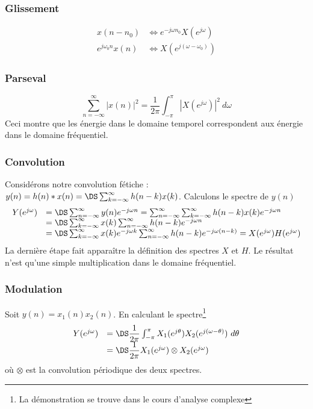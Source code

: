 		\subsubsection{Glissement}
		\begin{equation}
		\begin{array}{ll}
		x(n-n_0) &\Leftrightarrow e^{-j\omega n_0}X(e^{j\omega})\\
		e^{j\omega_0n}x(n) &\Leftrightarrow X\left(e^{j(\omega-\omega_0)}\right)
		\end{array}		
		\end{equation}


		\subsubsection{Parseval}
		\begin{equation}
		\sum_{n=-\infty}^\infty |x(n)|^2 = \dfrac{1}{2\pi}\int_{-\pi}^\pi \left|X(e^{j\omega})\right|^2\ 
		d\omega
		\end{equation}
		Ceci montre que les énergie dans le domaine temporel correspondent aux énergie dans le 
		domaine fréquentiel. 
		
		\subsubsection{Convolution}
		Considérons notre convolution fétiche : $y(n) = h(n)*x(n) = \DS \sum_{k=-\infty}^\infty 
		h(n-k)x(k)$. Calculons le spectre de $y(n)$
		\begin{equation}
		\begin{array}{ll}
		Y(e^{j\omega}) &= \DS \sum_{n=-\infty}^\infty y(n)e^{-j\omega n} = \sum_{n=-\infty}^\infty
		\sum_{k=-\infty}^\infty h(n-k)x(k)e^{-j\omega n}\\
		&= \DS\sum_{k=-\infty}^\infty x(k) \sum_{n=-\infty}^\infty h(n-k)e^{-j\omega n}\\
		&= \DS \sum_{k=-\infty}^\infty x(k)e^{-j\omega k} \sum_{n=-\infty}^\infty h(n-k)
		e^{-j\omega(n-k)} = X(e^{j\omega})H(e^{j\omega})
		\end{array}
		\end{equation}
		La dernière étape fait apparaître la définition des spectres $X$ et $H$. Le résultat 
		n'est qu'une simple multiplication dans le domaine fréquentiel.
		
		\subsubsection{Modulation}
		Soit $y(n) = x_1(n)x_2(n)$. En calculant le spectre\footnote{La démonstration se trouve dans le cours d'analyse complexe}
		\begin{equation}
		\begin{array}{ll}
		Y(e^{j\omega}) &= \DS \dfrac{1}{2\pi}\int_{-\pi}^\pi X_1(e^{j\theta})X_2(e^{j(\omega-\theta)})\ 
		d\theta\\
		&= \DS \dfrac{1}{2\pi}X_1(e^{j\omega}) \otimes X_2(e^{j\omega})
		\end{array}
		\end{equation}
		où $\otimes$ est la convolution périodique des deux spectres.


